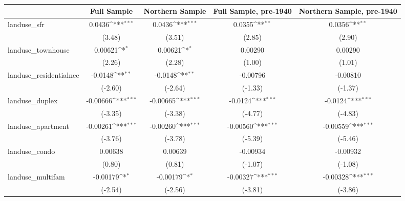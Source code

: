 \begin{table}[htbp]\centering
\def\sym#1{\ifmmode^{#1}\else\(^{#1}\)\fi}
\caption{ \label{tab1}}
\begin{tabular}{l*{4}{c}}
\toprule
                    &\multicolumn{1}{c}{Full Sample}&\multicolumn{1}{c}{Northern Sample}&\multicolumn{1}{c}{Full Sample, pre-1940}&\multicolumn{1}{c}{Northern Sample, pre-1940}\\
\midrule
landuse\_sfr         &      0.0436\sym{***}&      0.0436\sym{***}&      0.0355\sym{**} &      0.0356\sym{**} \\
                    &      (3.48)         &      (3.51)         &      (2.85)         &      (2.90)         \\
\addlinespace
landuse\_townhouse   &     0.00621\sym{*}  &     0.00621\sym{*}  &     0.00290         &     0.00290         \\
                    &      (2.26)         &      (2.28)         &      (1.00)         &      (1.01)         \\
\addlinespace
landuse\_residentialnec&     -0.0148\sym{**} &     -0.0148\sym{**} &    -0.00796         &    -0.00810         \\
                    &     (-2.60)         &     (-2.64)         &     (-1.33)         &     (-1.37)         \\
\addlinespace
landuse\_duplex      &    -0.00666\sym{***}&    -0.00665\sym{***}&     -0.0124\sym{***}&     -0.0124\sym{***}\\
                    &     (-3.35)         &     (-3.38)         &     (-4.77)         &     (-4.83)         \\
\addlinespace
landuse\_apartment   &    -0.00261\sym{***}&    -0.00260\sym{***}&    -0.00560\sym{***}&    -0.00559\sym{***}\\
                    &     (-3.76)         &     (-3.78)         &     (-5.39)         &     (-5.46)         \\
\addlinespace
landuse\_condo       &     0.00638         &     0.00639         &    -0.00934         &    -0.00932         \\
                    &      (0.80)         &      (0.81)         &     (-1.07)         &     (-1.08)         \\
\addlinespace
landuse\_multifam    &    -0.00179\sym{*}  &    -0.00179\sym{*}  &    -0.00327\sym{***}&    -0.00328\sym{***}\\
                    &     (-2.54)         &     (-2.56)         &     (-3.81)         &     (-3.86)         \\

\end{tabular}
\end{table}
